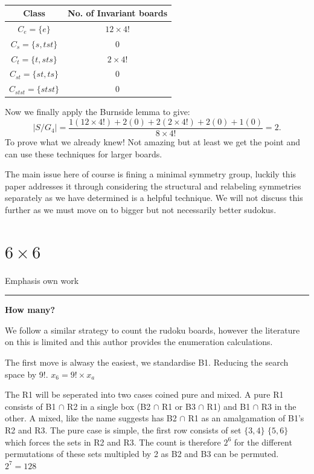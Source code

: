 \documentclass[a4paper,11pt]{report}
\newcounter{row}
\begin{document}
\begin{table}[!h]
\begin{center}
\begin{tabular}{ |c|c| }
 \hline
Class  & No. of Invariant boards\\
 \hline
$C_e=\{e\}$&$12\times 4!$\\
$C_s = \{s,tst\}$&0\\
$C_t = \{t,sts\}$&$2\times4!$\\
$C_{st}=\{st,ts\}$&0\\
$C_{stst}=\{stst\}$&0\\
\hline
\end{tabular}
\end{center}
\caption{\label{table:burnside}}
\end{table}

Now we finally apply the Burnside lemma to give:
\begin{equation}|S/G_4|=\frac{1(12\times 4!)+ 2(0)+2(2\times 4!)+2(0)+1(0)}{8\times 4!}=2.\end{equation}
To prove what we already knew! Not amazing but at least we get the point and can use these techniques for larger boards.

The main issue here of course is fining a minimal symmetry group, luckily this paper addresses it \cite{minimal complete shidoku symmetry groups} through considering the structural and relabeling symmetries separately as we have determined is a helpful technique. We will not discuss this further as we must move on to bigger but not necessarily better sudokus.

	\section{$6 \times 6$}
	
Emphasis own work 
\noindent\rule{4cm}{0.4pt}
\textbf{How many?}

We follow a similar strategy to count the rudoku boards, however the literature on this is limited and this author provides the enumeration calculations. 

The first move is alwasy the easiest, we standardise B1. Reducing the search space by 9!.  $x_6=9!\times x_a$

The R1 will be seperated into two cases coined pure and mixed. A pure R1 consists of B1 $\cap$ R2 in a single box (B2 $\cap$ R1 or B3 $\cap$ R1) and B1 $\cap$ R3 in the other. A mixed, like the name suggests has B2 $\cap$ R1 as an amalgamation of B1's R2 and R3. The pure case is simple, the first row consists of set $\{3,4\}$ $\{5,6\}$ which forces the sets in R2 and R3. The count is therefore $2^6$ for the different permutations of these sets multipled by 2 as B2 and B3 can be permuted. $2^7=128$
\end{document}
